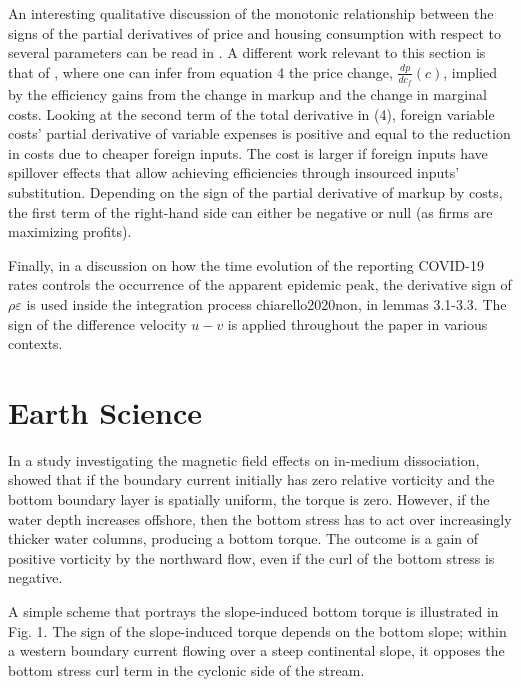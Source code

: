 \documentclass[11pt]{book}
\begin{document}
An interesting qualitative discussion of the monotonic relationship between the signs of the partial derivatives of price and housing consumption
with respect to several parameters can be read in \cite{basso2017effects}. A different work relevant to this section is that of \cite{navarramarkup}, where one can infer from equation 4 the price
change, $\frac{dp}{dc_{f}}\left(c\right)$, implied by the efficiency
gains from the change in markup and the change in marginal
costs. Looking at the second term of the total derivative in (4),
foreign variable costs' partial derivative of variable expenses is
positive and equal to the reduction in costs due to cheaper foreign
inputs. The cost is larger if foreign inputs have spillover effects that
allow achieving efficiencies through insourced inputs' substitution.
Depending on the sign of the partial derivative of markup by costs,
the first term of the right-hand side can either be negative or null
(as firms are maximizing profits).

Finally, in a discussion on how the time evolution of the reporting COVID-19 rates controls the occurrence of the apparent epidemic peak, the derivative sign of $\rho\varepsilon$ is used inside the integration
process {chiarello2020non}, in lemmas 3.1-3.3. The sign of the difference velocity $u-v$ is applied throughout the
paper in various contexts.


\section{Earth Science}

In a study investigating the magnetic field effects on in-medium dissociation, \cite{lee2001slope} showed that if the boundary current initially has zero
relative vorticity and the bottom boundary layer is spatially uniform,
the torque is zero. However, if the water depth increases offshore, then the bottom stress has to act over increasingly thicker
water columns, producing a bottom torque. The outcome is a gain of
positive vorticity by the northward flow, even if the curl of the
bottom stress is negative. 

A simple scheme that portrays the slope-induced
bottom torque is illustrated in Fig. 1. The sign of the slope-induced
torque depends on the bottom slope; within a western boundary current
flowing over a steep continental slope, it opposes the bottom stress
curl term in the cyclonic side of the stream.
\end{document}

